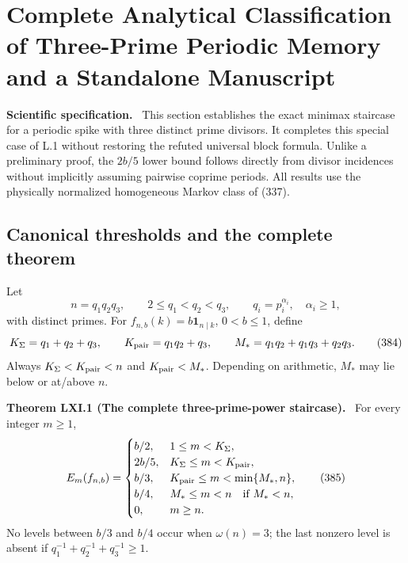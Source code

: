 \documentclass[11pt,a4paper,oneside]{book}
\newcommand{\one}{\mathbf 1}\newcommand{\ii}{\mathrm i}\newcommand{\dd}{\mathrm d}
\newcommand{\statement}[3]{\par\medskip\noindent\textbf{#1 #2 (#3).}\ }
\newcommand{\note}[1]{\par\medskip\noindent\textbf{#1}\ }
\begin{document}
\chapter{Complete Analytical Classification of Three-Prime Periodic Memory and a Standalone Manuscript}
\note{Scientific specification.} This section establishes the exact minimax staircase for a periodic spike with three distinct prime divisors. It completes this special case of L.1 without restoring the refuted universal block formula. Unlike a preliminary proof, the $2b/5$ lower bound follows directly from divisor incidences without implicitly assuming pairwise coprime periods. All results use the physically normalized homogeneous Markov class of (337).
\section{Canonical thresholds and the complete theorem}
Let
\begin{equation}n=q_1q_2q_3,\qquad2\le q_1<q_2<q_3,\qquad q_i=p_i^{\alpha_i},\quad\alpha_i\ge1,\tag{383}\end{equation}
with distinct primes. For $f_{n,b}(k)=b\one_{n\mid k}$, $0<b\le1$, define
\begin{equation}K_\Sigma=q_1+q_2+q_3,\qquad K_{\rm pair}=q_1q_2+q_3,\qquad M_*=q_1q_2+q_1q_3+q_2q_3.\tag{384}\end{equation}
Always $K_\Sigma<K_{\rm pair}<n$ and $K_{\rm pair}<M_*$. Depending on arithmetic, $M_*$ may lie below or at/above $n$.
\statement{Theorem}{LXI.1}{The complete three-prime-power staircase}
For every integer $m\ge1$,
\begin{equation}E_m(f_{n,b})=\begin{cases}
b/2,&1\le m<K_\Sigma,\\
2b/5,&K_\Sigma\le m<K_{\rm pair},\\
b/3,&K_{\rm pair}\le m<\min\{M_*,n\},\\
b/4,&M_*\le m<n\quad\text{if }M_*<n,\\
0,&m\ge n.
\end{cases}\tag{385}\end{equation}
No levels between $b/3$ and $b/4$ occur when $\omega(n)=3$; the last nonzero level is absent if $q_1^{-1}+q_2^{-1}+q_3^{-1}\ge1$.
\end{document}
